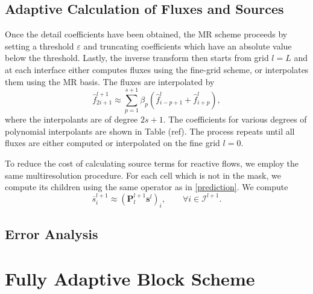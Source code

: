 \documentclass[]{article}
\begin{document}
    \subsection*{Adaptive Calculation of Fluxes and Sources}

        Once the detail coefficients have been obtained, the MR scheme
        proceeds by setting a threshold $\varepsilon$ and truncating coefficients
        which have an absolute value below the threshold. Lastly, the inverse
        transform then starts from grid $l=L$ and at each interface either
        computes fluxes using the fine-grid scheme, or interpolates them using
        the MR basis. The fluxes are interpolated by
        \begin{equation}
            \hat{f}_{2i+1}^{l+1} \approx \sum_{p=1}^{s+1} \beta_{p} \left(
            \hat{f}^{l}_{i-p+1} + \hat{f}^{l}_{i+p} \right),
        \end{equation}
        where the interpolants are of degree $2s+1$. The coefficients for
        various degrees of polynomial interpolants are shown in Table (ref).
        The process repeats until all fluxes are either computed or
        interpolated on the fine grid $l=0$.

        To reduce the cost of calculating source terms for reactive flows, we employ
        the same multiresolution procedure. For each cell which is not in the mask,
        we compute its children using the same operator as in \ref{prediction}.
        We compute
        \begin{equation}
            \overline{s}_{i}^{l+1} \approx \left( \bm{P}_{l}^{l+1} \bm{s}^{l}
                \right)_{i}, \text{ } \text{ } \text{ } \forall i \in
                \bm{\mathcal{I}}^{l+1}.
        \end{equation}

    \subsection*{Error Analysis}

\section{Fully Adaptive Block Scheme}

\end{document}
